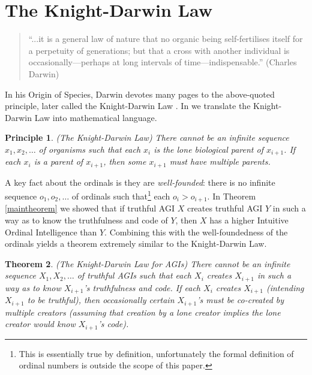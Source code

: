 \documentclass[runningheads]{llncs}
\newtheorem{mytheorem}{Theorem}
\newtheorem{myprinciple}[mytheorem]{Principle}
\begin{document}
\section{The Knight-Darwin Law}
\label{knightdarwinagisection}

\begin{quote}
``...it is a general law of nature that no organic being self-fertilises itself
for a perpetuity of generations; but that a cross with another individual
is occasionally---perhaps at long intervals of time---indispensable.''
(Charles Darwin)
\end{quote}

In his Origin of Species, Darwin devotes many
pages to the above-quoted principle, later called the
Knight-Darwin Law \cite{darwin1898knight}. In \cite{alexander2013}
we translate
the Knight-Darwin Law into mathematical language.

\begin{myprinciple}
(The Knight-Darwin Law)
There cannot be an infinite sequence
$x_1,x_2,\ldots$ of organisms such that each $x_i$
is the lone biological parent of $x_{i+1}$.
If each $x_i$ is a parent of $x_{i+1}$, then some $x_{i+1}$
must have multiple parents.
\end{myprinciple}

A key fact about the ordinals is they
are \emph{well-founded}:
there is
no infinite sequence $o_1,o_2,\ldots$ of ordinals such that\footnote{This
is essentially true by definition,
unfortunately the formal definition of ordinal numbers is outside the scope of
this paper.} each
$o_i>o_{i+1}$. In Theorem \ref{maintheorem} we showed that if truthful
AGI $X$ creates truthful AGI $Y$ in such a way as to know the truthfulness
and code of $Y$, then $X$ has a higher Intuitive Ordinal Intelligence
than $Y$. Combining this with the well-foundedness of the ordinals yields
a theorem extremely similar to the Knight-Darwin Law.

\begin{mytheorem}
\label{maintheorem2}
(The Knight-Darwin Law for AGIs)
There cannot be an infinite sequence
$X_1,X_2,\ldots$ of truthful AGIs such that each $X_i$
creates $X_{i+1}$ in such a way as to know $X_{i+1}$'s truthfulness and code.
If each $X_i$ creates $X_{i+1}$ (intending $X_{i+1}$ to be truthful), then
occasionally certain $X_{i+1}$'s must be
co-created by multiple creators (assuming that creation by
a lone creator implies the lone creator would know $X_{i+1}$'s code).
\end{mytheorem}
\end{document}
